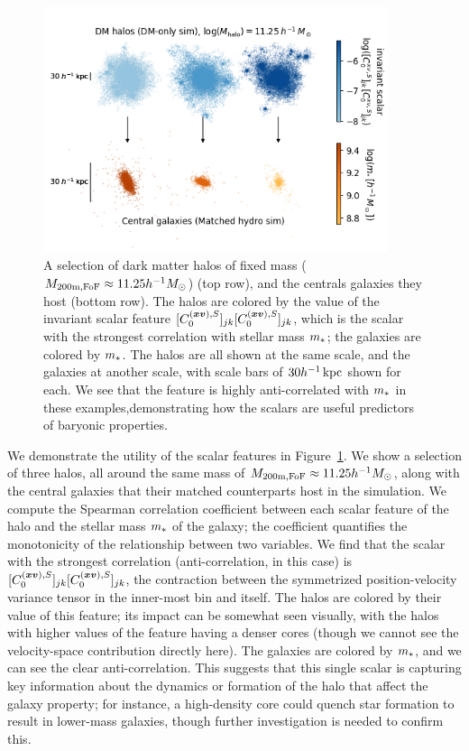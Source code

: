 \begin{figure}
    \centering
    \includegraphics[width=0.9\textwidth]{viz.png}
    \caption{A selection of dark matter halos of fixed mass ($M_\mathrm{200m,FoF} \approx 11.25 h^{-1} M_\mathrm{\odot}$) (top row), and the centrals galaxies they host (bottom row). The halos are colored by the value of the invariant scalar feature $[C^{(\bm{x}\bm{v}),S}_0]_{jk} [C^{(\bm{x}\bm{v}),S}_0]_{jk}$, which is the scalar with the strongest correlation with stellar mass $m_*$; the galaxies are colored by $m_*$. The halos are all shown at the same scale, and the galaxies at another scale, with scale bars of $30 h^{-1}\,\text{kpc}$ shown for each. We see that the feature is highly anti-correlated with $m_*$ in these examples,demonstrating how the scalars are useful predictors of baryonic properties.}
    \label{fig:halo_viz}
\end{figure}

We demonstrate the utility of the scalar features in Figure~\ref{fig:halo_viz}.
We show a selection of three \dark halos, all around the same mass of $M_\mathrm{200m,FoF} \approx 11.25 h^{-1} M_\mathrm{\odot}$, along with the central galaxies that their matched counterparts host in the \hydro simulation.
We compute the Spearman correlation coefficient between each scalar feature of the halo and the stellar mass $m_*$ of the galaxy; the coefficient quantifies the monotonicity of the relationship between two variables.
We find that the scalar with the strongest correlation (anti-correlation, in this case) is $[C^{(\bm{x}\bm{v}),S}_0]_{jk} [C^{(\bm{x}\bm{v}),S}_0]_{jk}$, the contraction between the symmetrized position-velocity variance tensor in the inner-most bin and itself.
The halos are colored by their value of this feature; its impact can be somewhat seen visually, with the halos with higher values of the feature having a denser cores (though we cannot see the velocity-space contribution directly here).
The galaxies are colored by $m_*$, and we can see the clear anti-correlation.
This suggests that this single scalar is capturing key information about the dynamics or formation of the halo that affect the galaxy property; for instance, a high-density core could quench star formation to result in lower-mass galaxies, though further investigation is needed to confirm this.


